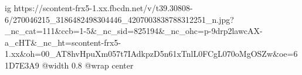  
 
 
 
 

\ifcmt
  ig https://scontent-frx5-1.xx.fbcdn.net/v/t39.30808-6/270046215_3186482498304446_4207003838788312251_n.jpg?_nc_cat=111&ccb=1-5&_nc_sid=825194&_nc_ohc=p-9drp2lawcAX-a_cHT&_nc_ht=scontent-frx5-1.xx&oh=00_AT8hvHpuXm057t7IAdkpzD5n61xTnlL0FCgL070oMgOSZw&oe=61D7E3A9
  @width 0.8
	@wrap center
\fi
